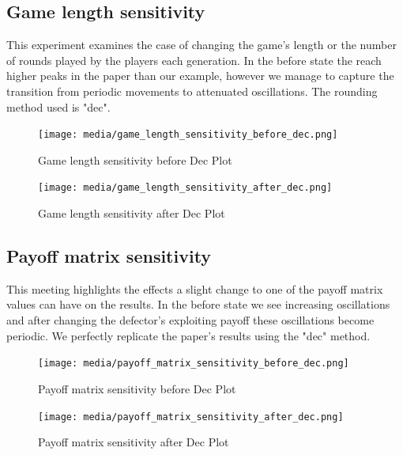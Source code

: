 \documentclass[12pt]{article}
\begin{document}
\subsection{Game length sensitivity}
This experiment examines the case of changing the game's length or the number of rounds played by the players each generation. In the before state the reach higher peaks in the paper than our example, however we manage to capture the transition from periodic movements to attenuated oscillations. The rounding method used is "dec".
\begin{figure}[H]
    \centering
    \texttt{[image: media/game\_length\_sensitivity\_before\_dec.png]}
    \caption{Game length sensitivity before Dec Plot}
\end{figure}
\begin{figure}[H]
    \centering
    \texttt{[image: media/game\_length\_sensitivity\_after\_dec.png]}
    \caption{Game length sensitivity after Dec Plot}
\end{figure}

\subsection{Payoff matrix sensitivity}
This meeting highlights the effects a slight change to one of the payoff matrix values can have on the results. In the before state we see increasing oscillations and after changing the defector's exploiting payoff these oscillations become periodic. We perfectly replicate the paper's results using the "dec" method. 
\begin{figure}[H]
    \centering
    \texttt{[image: media/payoff\_matrix\_sensitivity\_before\_dec.png]}
    \caption{Payoff matrix sensitivity before Dec Plot}
\end{figure}
\begin{figure}[H]
    \centering
    \texttt{[image: media/payoff\_matrix\_sensitivity\_after\_dec.png]}
    \caption{Payoff matrix sensitivity after Dec Plot}
\end{figure}
\end{document}
